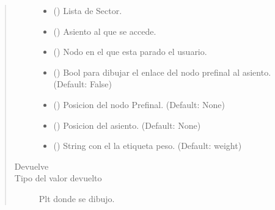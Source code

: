 \documentclass[letterpaper,10pt,spanish]{sphinxmanual}
\begin{document}
\begin{fulllineitems}
\begin{quote}
\begin{description}
\begin{itemize}
\item {} 
\sphinxAtStartPar
{} () \textendash{} Lista de Sector.

\item {} 
\sphinxAtStartPar
{} ({\hyperref[\detokenize{Clases:Clases.Asiento}]{}}) \textendash{} Asiento al que se accede.

\item {} 
\sphinxAtStartPar
{} () \textendash{} Nodo en el que esta parado el usuario.

\item {} 
\sphinxAtStartPar
{} (\sphinxstyleliteralemphasis{\sphinxupquote{, }}) \textendash{} Bool para dibujar el enlace del nodo prefinal al asiento. (Default: False)

\item {} 
\sphinxAtStartPar
{} (\sphinxstyleliteralemphasis{\sphinxupquote{, }}) \textendash{} Posicion del nodo Prefinal. (Default: None)

\item {} 
\sphinxAtStartPar
{} (\sphinxstyleliteralemphasis{\sphinxupquote{, }}) \textendash{} Posicion del asiento. (Default: None)

\item {} 
\sphinxAtStartPar
{} (\sphinxstyleliteralemphasis{\sphinxupquote{, }}) \textendash{} String con el la etiqueta peso. (Default: weight)

\end{itemize}

\item[{Devuelve}] \leavevmode
\sphinxAtStartPar


\item[{Tipo del valor devuelto}] \leavevmode
\sphinxAtStartPar
Plt donde se dibujo.

\end{description}\end{quote}

\end{fulllineitems}
\end{document}

